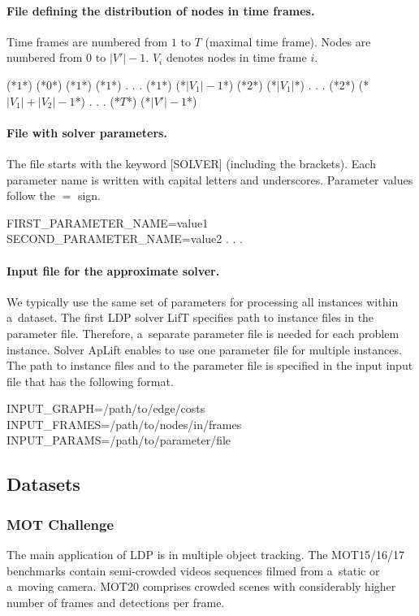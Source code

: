 \paragraph{File defining the distribution of nodes in time frames.} Time frames are numbered from $1$ to $T$ (maximal time frame). Nodes are numbered from $0$ to $|V'|-1$. $V_i$ denotes nodes in time frame $i$.
\begin{fileformat}
(*$1$*) (*$0$*)
(*$1$*) (*$1$*)
.
.
.
(*$1$*) (*$|V_1|-1$*)
(*$2$*) (*$|V_1|$*)
.
.
.
(*$2$*) (*$|V_1|+|V_2|-1$*)
.
.
.
(*$T$*) (*$|V'|-1$*)
\end{fileformat}
\paragraph{File with solver parameters.}The file starts with the keyword [SOLVER] (including the brackets). Each parameter name is written with capital letters and underscores. Parameter values follow the $=$ sign.
\begin{fileformat}
[SOLVER]
FIRST_PARAMETER_NAME=value1
SECOND_PARAMETER_NAME=value2
.
.
.
\end{fileformat}

\paragraph{Input file for the approximate solver.} We typically use the same set of parameters for processing all instances within a~dataset. The first LDP solver LifT specifies path to instance files in the parameter file. Therefore, a~separate parameter file is needed for each problem instance. Solver ApLift enables to use one parameter file for multiple instances. The path to instance files and to the parameter file is specified in the input input file that has the following format. 
\begin{fileformat}
INPUT_GRAPH=/path/to/edge/costs
INPUT_FRAMES=/path/to/nodes/in/frames
INPUT_PARAMS=/path/to/parameter/file
\end{fileformat}

\subsection{Datasets}
\subsubsection{MOT Challenge}
The main application of LDP is in multiple object tracking.
The MOT15/16/17 benchmarks \cite{MOTChallenge2015,MOT16} contain semi-crowded videos sequences filmed from a~static or a~moving camera. 
MOT20 \cite{MOTChallenge20} comprises crowded scenes with considerably higher number of  frames  and detections per frame.



